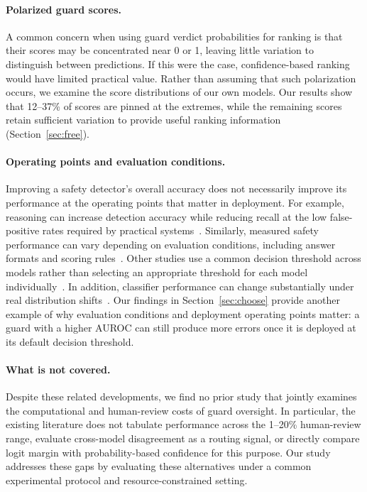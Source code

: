\documentclass[11pt]{article}
\begin{document}
\paragraph{Polarized guard scores.} A common concern when using guard verdict probabilities for ranking is that their scores may be concentrated near 0 or 1, leaving little variation to distinguish between predictions. If this were the case, confidence-based ranking would have limited practical value. Rather than assuming that such polarization occurs, we examine the score distributions of our own models. Our results show that 12--37\% of scores are pinned at the extremes, while the remaining scores retain sufficient variation to provide useful ranking information (Section~\ref{sec:free}).

\paragraph{Operating points and evaluation conditions.} Improving a safety detector's overall accuracy does not necessarily improve its performance at the operating points that matter in deployment. For example, reasoning can increase detection accuracy while reducing recall at the low false-positive rates required by practical systems~\cite{chegini2025razor}. Similarly, measured safety performance can vary depending on evaluation conditions, including answer formats and scoring rules~\cite{gringras2026scaffolding}. Other studies use a common decision threshold across models rather than selecting an appropriate threshold for each model individually~\cite{dacruz2026distillation}. In addition, classifier performance can change substantially under real distribution shifts~\cite{fomin2026benchmarks}. Our findings in Section~\ref{sec:choose} provide another example of why evaluation conditions and deployment operating points matter: a guard with a higher AUROC can still produce more errors once it is deployed at its default decision threshold.

\paragraph{What is not covered.} Despite these related developments, we find no prior study that jointly examines the computational and human-review costs of guard oversight. In particular, the existing literature does not tabulate performance across the 1--20\% human-review range, evaluate cross-model disagreement as a routing signal, or directly compare logit margin with probability-based confidence for this purpose. Our study addresses these gaps by evaluating these alternatives under a common experimental protocol and resource-constrained setting.
\end{document}
